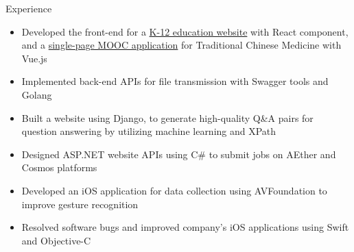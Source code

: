 \begin{MySection}{Experience}
    \begin{itemize}
        \item Developed the front-end 
        for a \href{http://k12mlmq.com/}{K-12 education website} 
        with React component,
        and a \href{http://www.ml-mq.com/}{single-page MOOC application} 
        for Traditional Chinese Medicine 
        with Vue.js
        \item Implemented back-end APIs 
        for file transmission
        with Swagger tools and Golang
    \end{itemize}

    \begin{itemize}
        \item Built a website using Django,
        to generate high-quality Q\&A pairs
        for question answering
        by utilizing machine learning and XPath
        \item Designed ASP.NET website APIs
        using C\# to submit jobs
        on AEther and Cosmos platforms
    \end{itemize}

    \begin{itemize}
        \item Developed an iOS application
        for data collection
        using AVFoundation
        to improve gesture recognition
        \item Resolved software bugs
        and improved company's iOS applications
        using Swift and Objective-C
    \end{itemize}\vspace{-12pt}
\end{MySection}